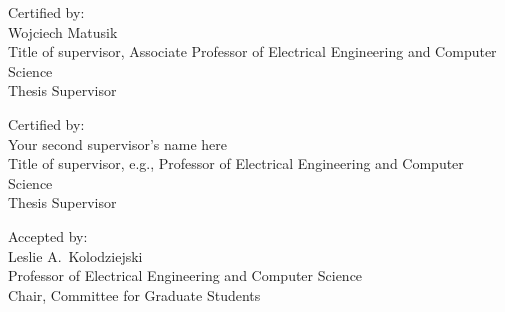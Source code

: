 \vspace{.15in}

\noindent
Certified by: \underline{\mbox{\hspace{4.827in}}} \\
\vspace{-.25in}
{\flushright Wojciech Matusik\\
Title of supervisor, Associate Professor of Electrical Engineering and Computer Science \\
Thesis Supervisor \\
}

\vspace{.15in}

\noindent
Certified by: \underline{\mbox{\hspace{4.827in}}} \\
\vspace{-.25in}
{\flushright Your second supervisor's name here \\
Title of supervisor, e.g., Professor of Electrical Engineering and Computer Science \\
Thesis Supervisor \\
}

\vspace{.15in}

\noindent
Accepted by: \underline{\mbox{\hspace{4.79in}}} \\
\vspace{-.25in}
{\flushright Leslie A.~Kolodziejski \\
Professor of Electrical Engineering and Computer Science \\
Chair, Committee for Graduate Students \\
}

\cleardoublepage
